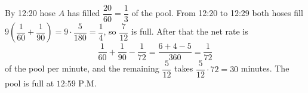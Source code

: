 By 12:20 hose $A$ has filled $\dfrac{20}{60}=\dfrac{1}{3}$ of the pool. From 12:20 to 12:29 both hoses fill $9\left(\dfrac{1}{60}+\dfrac{1}{90}\right)=9\cdot\dfrac{5}{180}=\dfrac{1}{4}$, so $\dfrac{7}{12}$ is full. After that the net rate is
\[
\dfrac{1}{60}+\dfrac{1}{90}-\dfrac{1}{72}=\dfrac{6+4-5}{360}=\dfrac{1}{72}
\]
of the pool per minute, and the remaining $\dfrac{5}{12}$ takes $\dfrac{5}{12}\cdot72=30$ minutes. The pool is full at $\boxed{\text{12:59 P.M.}}$
